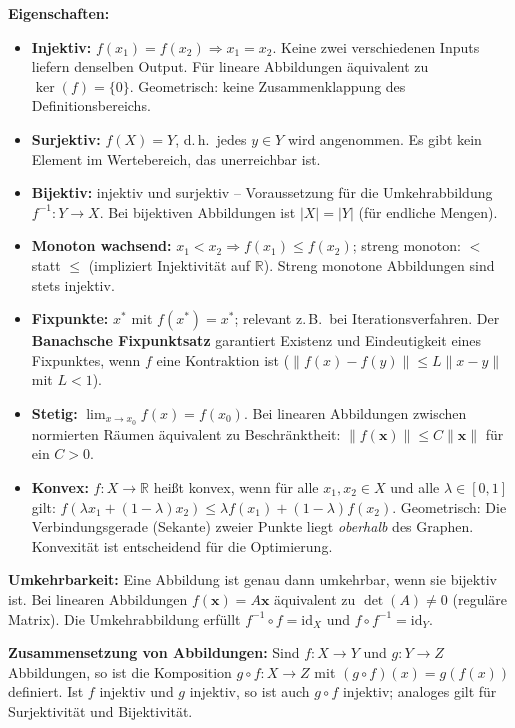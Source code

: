 \textbf{Eigenschaften:}
\begin{itemize}[leftmargin=1.5em]
    \item \textbf{Injektiv:} $f(x_1) = f(x_2) \Rightarrow x_1 = x_2$. Keine zwei verschiedenen Inputs liefern denselben Output. Für lineare Abbildungen äquivalent zu $\ker(f) = \{0\}$. Geometrisch: keine Zusammenklappung des Definitionsbereichs.
    \item \textbf{Surjektiv:} $f(X) = Y$, d.\,h.\ jedes $y \in Y$ wird angenommen. Es gibt kein Element im Wertebereich, das unerreichbar ist.
    \item \textbf{Bijektiv:} injektiv und surjektiv -- Voraussetzung für die Umkehrabbildung $f^{-1}: Y \to X$. Bei bijektiven Abbildungen ist $|X| = |Y|$ (für endliche Mengen).
    \item \textbf{Monoton wachsend:} $x_1 < x_2 \Rightarrow f(x_1) \leq f(x_2)$; streng monoton: $<$ statt $\leq$ (impliziert Injektivität auf $\mathbb{R}$). Streng monotone Abbildungen sind stets injektiv.
    \item \textbf{Fixpunkte:} $x^*$ mit $f(x^*) = x^*$; relevant z.\,B.\ bei Iterationsverfahren. Der \textbf{Banachsche Fixpunktsatz} garantiert Existenz und Eindeutigkeit eines Fixpunktes, wenn $f$ eine Kontraktion ist ($\|f(x)-f(y)\| \leq L\|x-y\|$ mit $L<1$).
    \item \textbf{Stetig:} $\lim_{x \to x_0} f(x) = f(x_0)$. Bei linearen Abbildungen zwischen normierten Räumen äquivalent zu Beschränktheit: $\|f(\bm{x})\| \leq C\|\bm{x}\|$ für ein $C > 0$.
    \item \textbf{Konvex:} $f: X \to \mathbb{R}$ heißt konvex, wenn für alle $x_1, x_2 \in X$ und alle $\lambda \in [0,1]$ gilt: $f(\lambda x_1 + (1-\lambda)x_2) \leq \lambda f(x_1) + (1-\lambda)f(x_2)$. Geometrisch: Die Verbindungsgerade (Sekante) zweier Punkte liegt \emph{oberhalb} des Graphen. Konvexität ist entscheidend für die Optimierung.
\end{itemize}

\textbf{Umkehrbarkeit:} Eine Abbildung ist genau dann umkehrbar, wenn sie bijektiv ist. Bei linearen Abbildungen $f(\bm{x}) = A\bm{x}$ äquivalent zu $\det(A) \neq 0$ (reguläre Matrix). Die Umkehrabbildung erfüllt $f^{-1} \circ f = \mathrm{id}_X$ und $f \circ f^{-1} = \mathrm{id}_Y$.

\textbf{Zusammensetzung von Abbildungen:} Sind $f: X \to Y$ und $g: Y \to Z$ Abbildungen, so ist die Komposition $g \circ f: X \to Z$ mit $(g \circ f)(x) = g(f(x))$ definiert. Ist $f$ injektiv und $g$ injektiv, so ist auch $g \circ f$ injektiv; analoges gilt für Surjektivität und Bijektivität.

